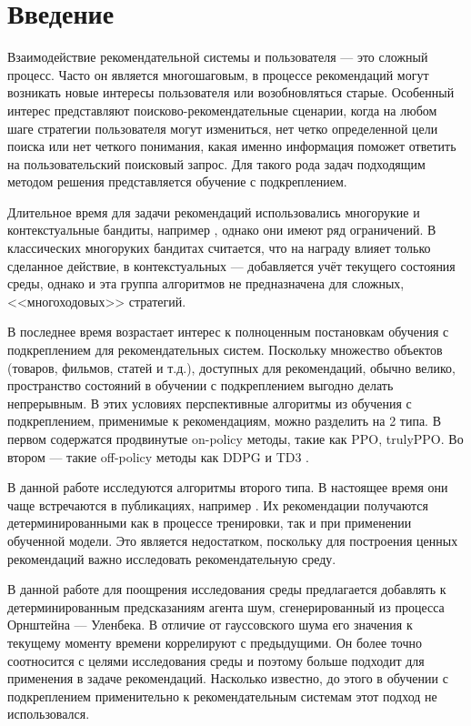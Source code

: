 \documentclass[14pt]{extarticle}
\begin{document}
\newpage


\section{Введение}
\label{sec:intro}

Взаимодействие рекомендательной системы и пользователя --- это сложный процесс. Часто он является многошаговым, в процессе рекомендаций могут возникать новые интересы пользователя или возобновляться старые. Особенный интерес представляют поисково-рекомендательные сценарии, когда на любом шаге стратегии пользователя могут измениться, нет четко определенной цели поиска или нет четкого понимания, какая именно информация поможет ответить на пользовательский поисковый запрос. Для такого рода задач подходящим методом решения представляется обучение с подкреплением.

Длительное время для задачи рекомендаций использовались многорукие и контекстуальные бандиты, например \cite{bandits}, однако они имеют ряд ограничений. В классических многоруких бандитах считается, что на награду влияет только сделанное действие, в контекстуальных --- добавляется учёт текущего состояния среды, однако и эта группа алгоритмов не предназначена для сложных, <<многоходовых>> стратегий.

В последнее время возрастает интерес к полноценным постановкам обучения с подкреплением для рекомендательных систем. Поскольку множество объектов (товаров, фильмов, статей и т.д.), доступных для рекомендаций, обычно велико, пространство состояний в обучении с подкреплением выгодно делать непрерывным. В этих условиях перспективные алгоритмы из обучения с подкреплением, применимые к рекомендациям, можно разделить на 2 типа. В первом содержатся продвинутые on-policy методы, такие как PPO\cite{ppo}, trulyPPO\cite{trulyPPO}. Во втором --- такие off-policy методы как DDPG \cite{ddpg} и TD3 \cite{td3}.

В данной работе исследуются алгоритмы второго типа. В настоящее время они чаще встречаются в публикациях, например \cite{first, latest, page-wise, list-wise}. Их рекомендации получаются детерминированными как в процессе тренировки, так и при применении обученной модели. Это является недостатком, поскольку для построения ценных рекомендаций важно исследовать рекомендательную среду.

В данной работе для поощрения исследования среды предлагается добавлять к детерминированным предсказаниям агента шум, сгенерированный из процесса Орнштейна --- Уленбека. В отличие от гауссовского шума его значения к текущему моменту времени коррелируют с предыдущими. Он более точно соотносится с целями исследования среды и поэтому больше подходит для применения в задаче рекомендаций. Насколько известно, до этого в обучении с подкреплением применительно к рекомендательным системам этот подход не использовался.
\end{document}
